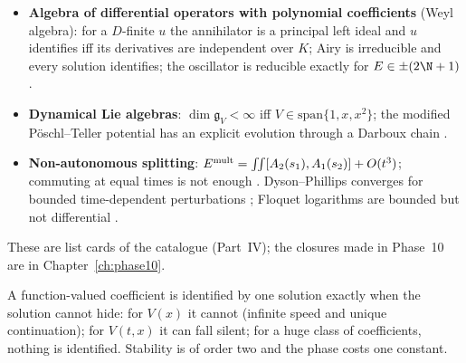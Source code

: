 \begin{itemize}
\item \textbf{Algebra of differential operators with polynomial coefficients} (Weyl algebra): for a $D$-finite $u$ the annihilator is a principal left ideal and $u$ identifies iff its derivatives are independent over $K$; Airy is irreducible and every solution identifies; the oscillator is reducible exactly for $E\in\pm(2\N+1)$ .
\item \textbf{Dynamical Lie algebras}: $\dim\mathfrak g_V<\infty$ iff $V\in\mathrm{span}\{1,x,x^2\}$; the modified P\"oschl--Teller potential has an explicit evolution through a Darboux chain .
\item \textbf{Non-autonomous splitting}: $E^{\rm mult}=\iint[A_2(s_1),A_1(s_2)]+O(t^3)$; commuting at equal times is not enough . Dyson--Phillips converges for bounded time-dependent perturbations ; Floquet logarithms are bounded but not differential .
\end{itemize}
These are list cards of the catalogue (Part~IV); the closures made in Phase~10 are in Chapter~\ref{ch:phase10}.

\begin{takeaway}
A function-valued coefficient is identified by one solution exactly when the solution cannot hide: for $V(x)$ it cannot (infinite speed and unique continuation); for $V(t,x)$ it can fall silent; for a huge class of coefficients, nothing is identified. Stability is of order two and the phase costs one constant.
\end{takeaway}
